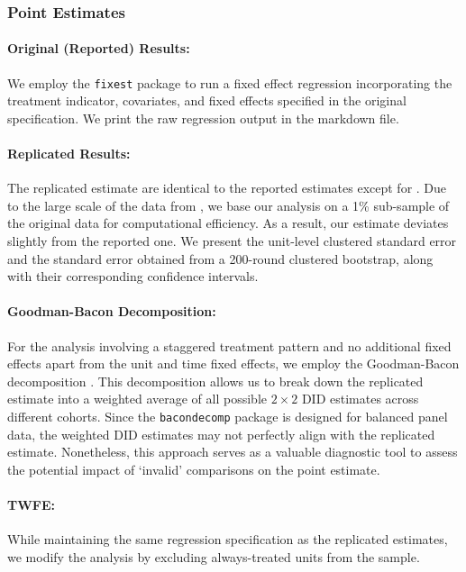 \documentclass[12pt]{article}
\begin{document}
\subsubsection{Point Estimates} 

\paragraph*{Original (Reported) Results:} We employ the \texttt{fixest} package \citep{fixest} to run a fixed effect regression incorporating the treatment indicator, covariates, and fixed effects specified in the original specification. We print the raw regression output in the markdown file.

\paragraph*{Replicated Results:} The replicated estimate are identical to the reported estimates except for \citet{Hall2022}. Due to the large scale of the data from \citet{Hall2022}, we base our analysis on a 1\% sub-sample of the original data for computational efficiency. As a result, our estimate deviates slightly from the reported one. We present the unit-level clustered standard error and the standard error obtained from a 200-round clustered bootstrap, along with their corresponding confidence intervals. 

\paragraph*{Goodman-Bacon Decomposition:} For the analysis involving a staggered treatment pattern and no additional fixed effects apart from the unit and time fixed effects, we employ the Goodman-Bacon decomposition \citep{Goodman-Bacon2021-xb}. This decomposition allows us to break down the replicated estimate into a weighted average of all possible $2 \times 2$ DID estimates across different cohorts. Since the \texttt{bacondecomp} package is designed for balanced panel data, the weighted DID estimates may not perfectly align with the replicated estimate. Nonetheless, this approach serves as a valuable diagnostic tool to assess the potential impact of `invalid' comparisons on the point estimate.


\paragraph*{TWFE:} While maintaining the same regression specification as the replicated estimates, we modify the analysis by excluding always-treated units from the sample. 
\end{document}
